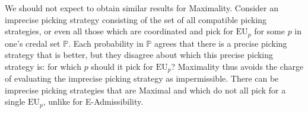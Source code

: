 \documentclass[a4paper,final]{article}
\renewcommand\P{\mathbb{P}} %
\newcommand\Exp{\mathsf{Exp}}
\newcommand\EU{\mathrm{EU}}
\newcommand\U{\mathfrak{U}} %
\newcommand{\n}{\mathsf{n}}
\newcommand{\imprecpickstrat}{\mathbb{N}}
\newcommand{\IB}{\mathbb{B}}
\newcommand{\IP}{\P}
\renewcommand{\leq}{\leqslant}
\newenvironment{CCM rewritten}
{\begingroup\color{blue}} %
{\endgroup}              %
\begin{document}
%	
%	
%
We should not expect to obtain similar results for Maximality.
Consider an imprecise picking strategy consisting of the set of all compatible picking strategies, or even all those which are coordinated and pick for $\EU_p$ for some $p$ in one's credal set $\IP$. Each probability in $\IP$ agrees that there is a precise picking strategy that is better, but they disagree about which this precise picking strategy is: for which $p$ should it pick for $\EU_p$?
Maximality thus avoids the charge of evaluating the imprecise picking strategy as impermissible. There can be imprecise picking strategies that are Maximal and which do not all pick for a single $\EU_p$, unlike for E-Admissibility.



\end{document}
